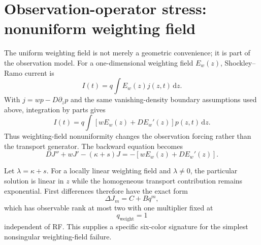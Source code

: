 \documentclass[11pt]{article}
\newcommand{\dd}{\mathrm{d}}
\begin{document}
\section{Observation-operator stress: nonuniform weighting field}

The uniform weighting field is not merely a geometric convenience; it is part of the observation model. For a one-dimensional weighting field $E_w(z)$, Shockley--Ramo current is
\begin{equation}
I(t)=q\int E_w(z)j(z,t)\,\dd z.
\end{equation}
With $j=wp-D\partial_zp$ and the same vanishing-density boundary assumptions used above, integration by parts gives
\begin{equation}
\boxed{I(t)=q\int\left[wE_w(z)+DE_w'(z)\right]p(z,t)\,\dd z.}
\label{eq:weighting_operator}
\end{equation}
Thus weighting-field nonuniformity changes the observation forcing rather than the transport generator. The backward equation becomes
\begin{equation}
\boxed{DJ''+wJ'-(\kappa+s)J=-\left[wE_w(z)+DE_w'(z)\right].}
\label{eq:weighting_bvp}
\end{equation}

Let $\lambda=\kappa+s$. For a locally linear weighting field and $\lambda\neq0$, the particular solution is linear in $z$ while the homogeneous transport contribution remains exponential. First differences therefore have the exact form
\begin{equation}
\boxed{\Delta J_m=C+Bq^m,}
\label{eq:weighting_rank2}
\end{equation}
which has observable rank at most two with one multiplier fixed at
\begin{equation}
\boxed{q_{\mathrm{weight}}=1}
\end{equation}
independent of RF. This supplies a specific six-color signature for the simplest nonsingular weighting-field failure.
\end{document}
